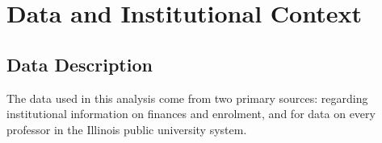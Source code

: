 \documentclass[notitlepage,12pt]{article}
\begin{document}
%        
%        
%        


\section{Data and Institutional Context}
\label{sec:data}

\subsection{Data Description}
The data used in this analysis come from two primary sources: \citet[IPEDS]{ipeds} regarding institutional information on finances and enrolment, and \citet[IBHED]{ibhed} for data on every professor in the Illinois public university system.
\end{document}
